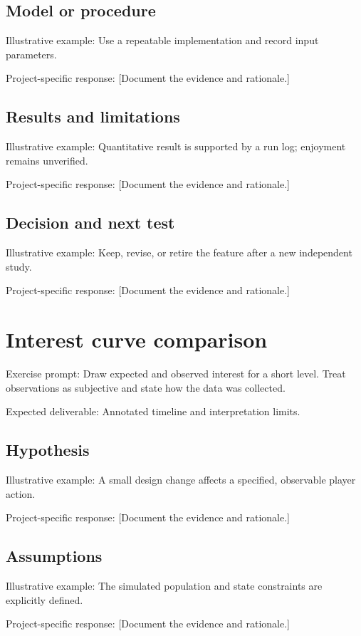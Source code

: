 \documentclass[11pt]{article}
\begin{document}
\subsection{Model or procedure}
Illustrative example: Use a repeatable implementation and record input parameters.

Project-specific response: [Document the evidence and rationale.]


\subsection{Results and limitations}
Illustrative example: Quantitative result is supported by a run log; enjoyment remains unverified.

Project-specific response: [Document the evidence and rationale.]


\subsection{Decision and next test}
Illustrative example: Keep, revise, or retire the feature after a new independent study.

Project-specific response: [Document the evidence and rationale.]


\section{Interest curve comparison}
Exercise prompt: Draw expected and observed interest for a short level. Treat observations as subjective and state how the data was collected.

Expected deliverable: Annotated timeline and interpretation limits.


\subsection{Hypothesis}
Illustrative example: A small design change affects a specified, observable player action.

Project-specific response: [Document the evidence and rationale.]


\subsection{Assumptions}
Illustrative example: The simulated population and state constraints are explicitly defined.

Project-specific response: [Document the evidence and rationale.]
\end{document}
